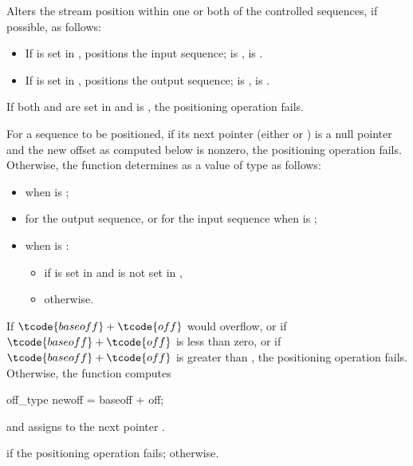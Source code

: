 \begin{itemdescr}
\pnum
\effects
Alters the stream position within one or both of the
controlled sequences, if possible, as follows:
\begin{itemize}
\item
If  is set in , positions the input sequence;
 is ,  is .
\item
If  is set in , positions the output sequence;
 is ,  is .
\end{itemize}

\pnum
If both  and  are set in 
and  is ,
the positioning operation fails.

\pnum
For a sequence to be positioned,
if its next pointer  (either  or )
is a null pointer and
the new offset  as computed below is nonzero,
the positioning operation fails.
Otherwise, the function determines 
as a value of type  as follows:
\begin{itemize}
\item
{} when  is ;
\item
{} for the output sequence, or
 for the input sequence
when  is ;
\item
when  is  :
\begin{itemize}
\item
{}
if  is set in  and
 is not set in ,
\item
{} otherwise.
\end{itemize}
\end{itemize}

\pnum
If $\tcode{baseoff} + \tcode{off}$ would overflow, or
if $\tcode{baseoff} + \tcode{off}$ is less than zero, or
if $\tcode{baseoff} + \tcode{off}$ is greater than ,
the positioning operation fails.
Otherwise, the function computes
\begin{codeblock}
off_type newoff = baseoff + off;
\end{codeblock}
and assigns  to the next pointer .

\pnum
\returns
{} if the positioning operation fails;
 otherwise.
\end{itemdescr}

